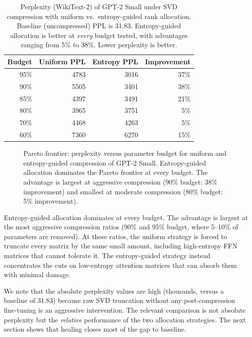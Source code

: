 \documentclass[11pt,a4paper]{article}
\begin{document}
\begin{table}[htbp]
\centering
\caption{Perplexity (WikiText-2) of GPT-2 Small under SVD compression
  with uniform vs.\ entropy-guided rank allocation.  Baseline
  (uncompressed) PPL is 31.83.  Entropy-guided allocation is better
  at \emph{every} budget tested, with advantages ranging from 5\% to
  38\%.  Lower perplexity is better.}
\label{tab:compression}
\begin{tabular}{@{}rrrr@{}}
\toprule
Budget & Uniform PPL & Entropy PPL & Improvement \\
\midrule
95\% & 4783 & 3016 & 37\% \\
90\% & 5505 & 3401 & 38\% \\
85\% & 4397 & 3491 & 21\% \\
80\% & 3965 & 3751 & ~5\% \\
70\% & 4468 & 4263 & ~5\% \\
60\% & 7360 & 6270 & 15\% \\
\bottomrule
\end{tabular}
\end{table}

\begin{figure}[htbp]
\centering
{}
\caption{Pareto frontier: perplexity versus parameter budget for
  uniform and entropy-guided compression of GPT-2 Small.
  Entropy-guided allocation dominates the Pareto frontier at every
  budget.  The advantage is largest at aggressive compression (90\%
  budget: 38\% improvement) and smallest at moderate compression
  (80\% budget: 5\% improvement).}
\label{fig:pareto}
\end{figure}

Entropy-guided allocation dominates at every budget.  The advantage
is largest at the most aggressive compression ratios (90\% and 95\%
budget, where 5--10\% of parameters are removed).  At these ratios,
the uniform strategy is forced to truncate every matrix by the same
small amount, including high-entropy FFN matrices that cannot
tolerate it.  The entropy-guided strategy instead concentrates the
cuts on low-entropy attention matrices that can absorb them with
minimal damage.

We note that the absolute perplexity values are high (thousands,
versus a baseline of 31.83) because raw SVD truncation without any
post-compression fine-tuning is an aggressive intervention.  The
relevant comparison is not absolute perplexity but the
\emph{relative} performance of the two allocation strategies.  The
next section shows that healing closes most of the gap to baseline.
\end{document}
